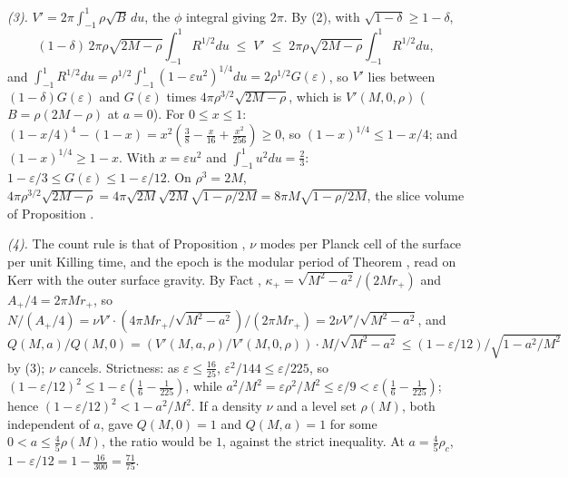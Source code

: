 \emph{(3).} $V' = 2\pi\int_{-1}^{1}\rho\sqrt{B}\,du$, the $\phi$ integral giving $2\pi$. By (2), with $\sqrt{1 - \delta} \ge 1 - \delta$,
\[
(1 - \delta)\,2\pi\rho\sqrt{2M - \rho}\int_{-1}^{1}R^{1/2}du \;\le\; V' \;\le\; 2\pi\rho\sqrt{2M - \rho}\int_{-1}^{1}R^{1/2}du ,
\]
and $\int_{-1}^{1}R^{1/2}du = \rho^{1/2}\int_{-1}^{1}(1 - \varepsilon u^{2})^{1/4}du = 2\rho^{1/2}G(\varepsilon)$, so $V'$ lies between $(1 - \delta)G(\varepsilon)$ and $G(\varepsilon)$ times $4\pi\rho^{3/2}\sqrt{2M - \rho}$, which is $V'(M, 0, \rho)$ ($B = \rho(2M - \rho)$ at $a = 0$). For $0 \le x \le 1$: $(1 - x/4)^{4} - (1 - x) = x^{2}(\tfrac38 - \tfrac{x}{16} + \tfrac{x^{2}}{256}) \ge 0$, so $(1 - x)^{1/4} \le 1 - x/4$; and $(1 - x)^{1/4} \ge 1 - x$. With $x = \varepsilon u^{2}$ and $\int_{-1}^{1}u^{2}du = \tfrac23$: $1 - \varepsilon/3 \le G(\varepsilon) \le 1 - \varepsilon/12$. On $\rho^{3} = 2M$, $4\pi\rho^{3/2}\sqrt{2M - \rho} = 4\pi\sqrt{2M}\sqrt{2M}\sqrt{1 - \rho/2M} = 8\pi M\sqrt{1 - \rho/2M}$, the slice volume of Proposition .

\emph{(4).} The count rule is that of Proposition , $\nu$ modes per Planck cell of the surface per unit Killing time, and the epoch is the modular period of Theorem , read on Kerr with the outer surface gravity. By Fact , $\kappa_{+} = \sqrt{M^{2} - a^{2}}/(2Mr_{+})$ and $A_{+}/4 = 2\pi Mr_{+}$, so $N/(A_{+}/4) = \nu V'\cdot(4\pi Mr_{+}/\sqrt{M^{2} - a^{2}})/(2\pi Mr_{+}) = 2\nu V'/\sqrt{M^{2} - a^{2}}$, and $Q(M, a)/Q(M, 0) = (V'(M, a, \rho)/V'(M, 0, \rho))\cdot M/\sqrt{M^{2} - a^{2}} \le (1 - \varepsilon/12)/\sqrt{1 - a^{2}/M^{2}}$ by (3); $\nu$ cancels. Strictness: as $\varepsilon \le \tfrac{16}{25}$, $\varepsilon^{2}/144 \le \varepsilon/225$, so $(1 - \varepsilon/12)^{2} \le 1 - \varepsilon(\tfrac16 - \tfrac1{225})$, while $a^{2}/M^{2} = \varepsilon\rho^{2}/M^{2} \le \varepsilon/9 < \varepsilon(\tfrac16 - \tfrac1{225})$; hence $(1 - \varepsilon/12)^{2} < 1 - a^{2}/M^{2}$. If a density $\nu$ and a level set $\rho(M)$, both independent of $a$, gave $Q(M, 0) = 1$ and $Q(M, a) = 1$ for some $0 < a \le \tfrac45\rho(M)$, the ratio would be $1$, against the strict inequality. At $a = \tfrac45\rho_{c}$, $1 - \varepsilon/12 = 1 - \tfrac{16}{300} = \tfrac{71}{75}$.
